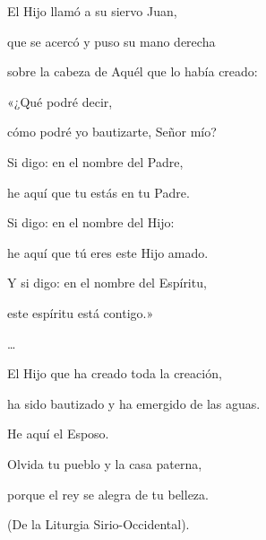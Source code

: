 \begin{patercite}
	El Hijo llamó a su siervo Juan,
	
	que se acercó y puso su mano derecha
	
	sobre la cabeza de Aquél que lo había creado:
	
	«¿Qué podré decir,
	
	cómo podré yo bautizarte, Señor mío?
	
	Si digo: en el nombre del Padre,
	
	he aquí que tu estás en tu Padre.
	
	Si digo: en el nombre del Hijo:
	
	he aquí que tú eres este Hijo amado.
	
	Y si digo: en el nombre del Espíritu,
	
	este espíritu está contigo.»
	
	\ldots{}
	
	El Hijo que ha creado toda la creación,
	
	ha sido bautizado y ha emergido de las aguas.
	
	He aquí el Esposo.
	
	Olvida tu pueblo y la casa paterna,
	
	porque el rey se alegra de tu belleza.
	
	(De la Liturgia Sirio-Occidental)\cite{LiturgiaSiria_001}.
\end{patercite}

